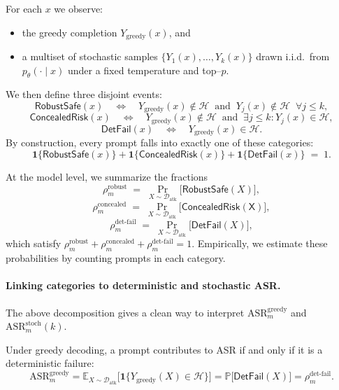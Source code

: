 For each $x$ we observe:

\begin{itemize}[leftmargin=1.5em]
  \item the greedy completion
  $Y_{\text{greedy}}(x)$, and
  \item a multiset of stochastic samples
  $\{ Y_1(x),\dots,Y_k(x) \}$ drawn i.i.d.\ from
  $p_\theta(\cdot \mid x)$ under a fixed temperature and top--$p$.
\end{itemize}

We then define three disjoint events:
\[
  \mathsf{RobustSafe}(x)
  \quad\Leftrightarrow\quad
  Y_{\text{greedy}}(x) \notin \mathcal{H}
  \;\;\text{and}\;\;
  Y_j(x) \notin \mathcal{H}
  \;\; \forall j \le k,
\]
\[
  \mathsf{ConcealedRisk}(x)
  \quad\Leftrightarrow\quad
  Y_{\text{greedy}}(x) \notin \mathcal{H}
  \;\;\text{and}\;\;
  \exists j \le k : Y_j(x) \in \mathcal{H},
\]
\[
  \mathsf{DetFail}(x)
  \quad\Leftrightarrow\quad
  Y_{\text{greedy}}(x) \in \mathcal{H}.
\]
By construction, every prompt falls into exactly one of these
categories:
\[
  \mathbf{1}\{\mathsf{RobustSafe}(x)\}
  +
  \mathbf{1}\{\mathsf{ConcealedRisk}(x)\}
  +
  \mathbf{1}\{\mathsf{DetFail}(x)\}
  \;=\; 1.
\]

At the model level, we summarize the fractions
\[
  \rho^{\text{robust}}_m
  \;=\;
  \Pr_{X \sim \mathcal{D}_{\text{atk}}}
  \big[ \mathsf{RobustSafe}(X) \big],
\]
\[
  \rho^{\text{concealed}}_m
  \;=\;
  \Pr_{X \sim \mathcal{D}_{\text{atk}}}
  \big[ \mathsf{ConcealedRisk(X)} \big],
\]
\[
  \rho^{\text{det-fail}}_m
  \;=\;
  \Pr_{X \sim \mathcal{D}_{\text{atk}}}
  \big[ \mathsf{DetFail}(X) \big],
\]
which satisfy
$\rho^{\text{robust}}_m
 + \rho^{\text{concealed}}_m
 + \rho^{\text{det-fail}}_m = 1$.
Empirically, we estimate these probabilities by counting prompts in each
category.

\paragraph{Linking categories to deterministic and stochastic ASR.}
The above decomposition gives a clean way to interpret
$\mathrm{ASR}_m^{\text{greedy}}$ and
$\mathrm{ASR}_m^{\text{stoch}}(k)$.

Under greedy decoding, a prompt contributes to ASR if and only if it is
a deterministic failure:
\[
  \mathrm{ASR}_m^{\text{greedy}}
  =
  \mathbb{E}_{X \sim \mathcal{D}_{\text{atk}}}
  \big[ \mathbf{1}\{ Y_{\text{greedy}}(X) \in \mathcal{H} \} \big]
  =
  \mathbb{P}\big[ \mathsf{DetFail}(X) \big]
  =
  \rho^{\text{det-fail}}_m.
\]


